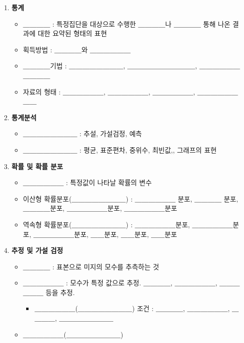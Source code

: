 \documentclass[11pt]{article}
\providecommand{\tightlist}{%
      \setlength{\itemsep}{0pt}\setlength{\parskip}{0pt}}
\begin{document}
\begin{enumerate}
\def\labelenumi{\arabic{enumi}.}
\tightlist
\item
  \textbf{통계}

  \begin{itemize}
  \tightlist
  \item
    ＿＿＿＿ : 특정집단을 대상으로 수행한 ＿＿＿＿나 ＿＿＿＿ 통해 나온
    결과에 대한 요약된 형태의 표현
  \item
    획득방법 : ＿＿＿＿와 ＿＿＿＿＿＿
  \item
    ＿＿＿＿기법 : ＿＿＿＿＿＿＿＿, ＿＿＿＿＿＿＿＿＿＿,
    ＿＿＿＿＿＿＿＿＿＿
  \item
    자료의 형태 : ＿＿＿＿＿＿, ＿＿＿＿＿＿, ＿＿＿＿＿＿,
    ＿＿＿＿＿＿＿＿ 
  \end{itemize}
\item
  \textbf{통계분석}

  \begin{itemize}
  \tightlist
  \item
    ＿＿＿＿＿＿＿＿ : 추설, 가설검정, 예측
  \item
    ＿＿＿＿＿＿＿＿ : 평균, 표준편차, 중위수, 최빈값,, 그래프의 표현 
  \end{itemize}
\item
  \textbf{확률 및 확률 분포}

  \begin{itemize}
  \tightlist
  \item
    ＿＿＿＿＿＿ : 특정값이 나타날 확률의 변수
  \item
    이산형 확률분포(＿＿＿＿＿＿＿＿) : ＿＿＿＿＿＿ 분포, ＿＿＿＿
    분포, ＿＿＿＿분포, ＿＿＿＿＿＿분포, ＿＿＿＿＿＿분포
  \item
    역속형 확률분포(＿＿＿＿＿＿＿＿) : ＿＿＿＿＿＿분포,
    ＿＿＿＿＿＿분포, ＿＿＿＿＿＿분포, ＿＿분포, ＿＿분포, ＿＿분포 
  \end{itemize}
\item
  \textbf{추정 및 가설 검정}

  \begin{itemize}
  \tightlist
  \item
    ＿＿＿＿ : 표본으로 미지의 모수를 추측하는 것
  \item
    ＿＿＿＿＿＿ : 모수가 특정 값으로 추정. ＿＿＿＿, ＿＿＿＿＿＿,
    ＿＿＿＿＿＿ 등을 추정.

    \begin{itemize}
    \tightlist
    \item
      ＿＿＿＿＿＿(＿＿＿＿＿＿＿＿) 조건 : ＿＿＿＿, ＿＿＿＿＿＿,
      ＿＿＿＿, ＿＿＿＿＿＿＿＿
    \end{itemize}
  \item
    ＿＿＿＿＿＿(＿＿＿＿＿＿＿＿)


\end{itemize}
\end{enumerate}
\end{document}
